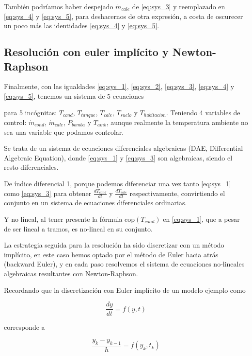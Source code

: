 También podríamos haber despejado $\dot{m}_{cale}$ de \eqref{eq:sys_3} y
reemplazado en \eqref{eq:sys_4} y \eqref{eq:sys_5}, para deshacernos de otra
expresión, a costa de oscurecer un poco más las identidades \eqref{eq:sys_4} y
\eqref{eq:sys_5}.


\subsection{Resolución con euler implícito y Newton-Raphson}

Finalmente, con las igualdades \eqref{eq:sys_1}, \eqref{eq:sys_2},
\eqref{eq:sys_3}, \eqref{eq:sys_4} y \eqref{eq:sys_5}, tenemos un sistema de 5
ecuaciones

para 5 incógnitas: $T_{cond}$, $T_{tanque}$, $T_{cale}$, $T_{suelo}$ y
$T_{habitacion}$. Teniendo 4 variables de control: $\dot{m}_{cond}$,
$\dot{m}_{cale}$, $P_{bomba}$ y $T_{amb}$, aunque realmente la temperatura
ambiente no sea una variable que podamos controlar.

Se trata de un sistema de ecuaciones diferenciales algebraicas (DAE,
Differential Algebraic Equation), donde \eqref{eq:sys_1} y \eqref{eq:sys_3} son
algebraicas, siendo el resto diferenciales.

De índice diferencial 1, porque podemos diferenciar una vez tanto
\eqref{eq:sys_1} como \eqref{eq:sys_3} para obtener $\frac{dT_{cond}}{dt}$ y
$\frac{dT_{cale}}{dt}$ respectivamente, convirtiendo el conjunto en un sistema
de ecuaciones diferenciales ordinarias.

Y no lineal, al tener presente la fórmula $\text{cop}(T_{cond})$ en
\eqref{eq:sys_1}, que a pesar de ser lineal a tramos, es no-lineal en su
conjunto.

La estrategia seguida para la resolución ha sido discretizar con un método
implícito, en este caso hemos optado por el método de Euler hacia atrás
(backward Euler), y en cada paso resolvemos el sistema de ecuaciones
no-lineales algebraicas resultantes con Newton-Raphson.

Recordando que la discretización con Euler implícito de un modelo ejemplo como

\begin{equation}
	\frac{dy}{dt} = f(y, t)
\end{equation}

corresponde a

\begin{equation}
	\frac{y_k - y_{k-1}}{h} = f(y_k, t_k)
\end{equation}

